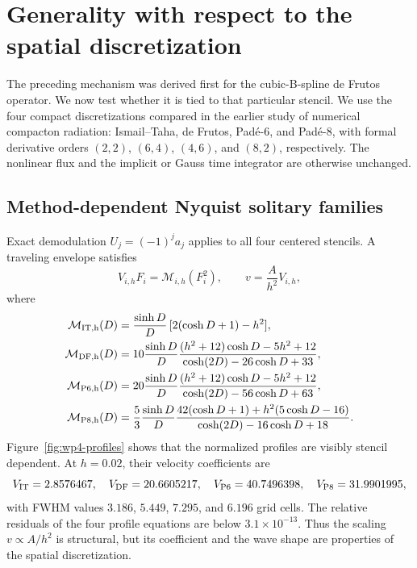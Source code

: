 \section{Generality with respect to the spatial discretization}
\label{sec:spatial-generality}

The preceding mechanism was derived first for the cubic-B-spline de Frutos
operator.  We now test whether it is tied to that particular stencil.  We use
the four compact discretizations compared in the earlier study of numerical
compacton radiation: Ismail--Taha, de Frutos, Pad\'e-6, and Pad\'e-8, with
formal derivative orders $(2,2)$, $(6,4)$, $(4,6)$, and $(8,2)$,
respectively.  The nonlinear flux and the implicit or Gauss time integrator
are otherwise unchanged.

\subsection{Method-dependent Nyquist solitary families}

Exact demodulation $U_j=(-1)^j a_j$ applies to all four centered stencils.  A
traveling envelope satisfies
\begin{equation}
 V_{i,h}F_i=\mathcal M_{i,h}(F_i^2),
 \qquad
 v=\frac{A}{h^2}V_{i,h},
 \label{eq:wp4-family}
\end{equation}
where
\begin{align}
\mathcal M_{\rm IT,h}(D)
 &=\frac{\sinh D}{D}\,[2(\cosh D+1)-h^2],\\
\mathcal M_{\rm DF,h}(D)
 &=10\frac{\sinh D}{D}
 \frac{(h^2+12)\cosh D-5h^2+12}
      {\cosh(2D)-26\cosh D+33},\\
\mathcal M_{\rm P6,h}(D)
 &=20\frac{\sinh D}{D}
 \frac{(h^2+12)\cosh D-5h^2+12}
      {\cosh(2D)-56\cosh D+63},\\
\mathcal M_{\rm P8,h}(D)
 &=\frac53\frac{\sinh D}{D}
 \frac{42(\cosh D+1)+h^2(5\cosh D-16)}
      {\cosh(2D)-16\cosh D+18}.
 \label{eq:wp4-operators}
\end{align}
Figure~\ref{fig:wp4-profiles} shows that the normalized profiles are visibly
stencil dependent.  At $h=0.02$, their velocity coefficients are
\begin{equation}
 V_{\rm IT}=2.8576467,\quad
 V_{\rm DF}=20.6605217,\quad
 V_{\rm P6}=40.7496398,\quad
 V_{\rm P8}=31.9901995,
 \label{eq:wp4-V}
\end{equation}
with FWHM values $3.186$, $5.449$, $7.295$, and $6.196$ grid cells.  The
relative residuals of the four profile equations are below $3.1\times10^{-13}$.
Thus the scaling $v\propto A/h^2$ is structural, but its coefficient and the
wave shape are properties of the spatial discretization.

